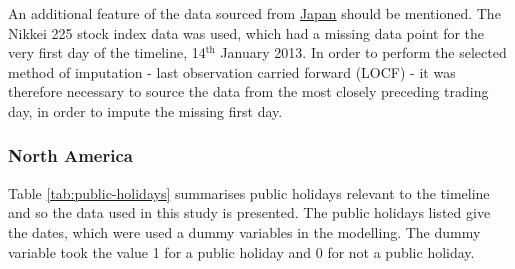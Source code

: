 \documentclass{article}
\begin{document}
An additional feature of the data sourced from \href{http://markets.on.nytimes.com/research/markets/holidays/holidays.asp?display\%3Dmarket&timeOffset\%3D-1&exchange\%3DTYO}{Japan} should be mentioned. The Nikkei 225 stock index data was used, which had a missing data point for the very first day of the timeline, 14$^{\text{th}}$ January 2013. In order to perform the selected method of imputation - last observation carried forward (LOCF) - it was therefore necessary to source the data from the most closely preceding trading day, in order to impute the missing first day.


\subsubsection{North America}
\label{sec-8-2-2}

Table \ref{tab:public-holidays} summarises public holidays relevant to the timeline and so the data used in this study is presented. The public holidays listed give the dates, which were used a dummy variables in the modelling. The dummy variable took the value 1 for a public holiday and 0 for not a public holiday.
\end{document}
